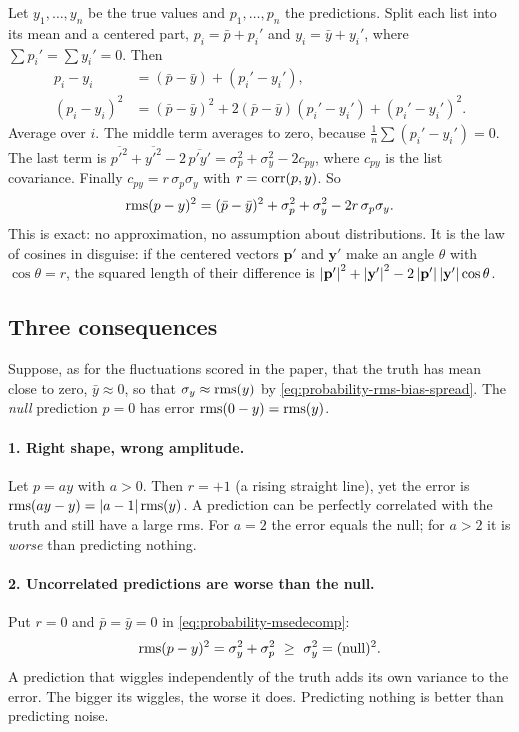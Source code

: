 Let $y_1,\dots,y_n$ be the true values and $p_1,\dots,p_n$ the predictions. Split each list into its mean and a centered part, $p_i=\bar p+p_i'$ and $y_i=\bar y+y_i'$, where $\sum p_i'=\sum y_i'=0$. Then
\begin{align*}
p_i-y_i &= (\bar p-\bar y) + (p_i'-y_i'),\\
(p_i-y_i)^2 &= (\bar p-\bar y)^2 + 2(\bar p-\bar y)(p_i'-y_i') + (p_i'-y_i')^2 .
\end{align*}
Average over $i$. The middle term averages to zero, because $\frac1n\sum(p_i'-y_i')=0$. The last term is $\overline{p'^2}+\overline{y'^2}-2\,\overline{p'y'}=\sigma_p^2+\sigma_y^2-2c_{py}$, where $c_{py}$ is the list covariance. Finally $c_{py}=r\,\sigma_p\sigma_y$ with $r=\mathrm{corr}(p,y)$. So
\begin{equation}
\mathrm{rms}(p-y)^2 = (\bar p-\bar y)^2 + \sigma_p^2 + \sigma_y^2 - 2r\,\sigma_p\sigma_y .
\label{eq:probability-msedecomp}
\end{equation}
This is exact: no approximation, no assumption about distributions. It is the law of cosines in disguise: if the centered vectors $\mathbf p'$ and $\mathbf y'$ make an angle $\theta$ with $\cos\theta=r$, the squared length of their difference is $\left\lvert \mathbf p'\right\rvert^2+\left\lvert \mathbf y'\right\rvert^2-2\left\lvert \mathbf p'\right\rvert\left\lvert \mathbf y'\right\rvert\cos\theta$.

\subsection{Three consequences}

Suppose, as for the fluctuations scored in the paper, that the truth has mean close to zero, $\bar y\approx0$, so that $\sigma_y\approx\mathrm{rms}(y)$ by \cref{eq:probability-rms-bias-spread}. The \emph{null} prediction $p=0$ has error $\mathrm{rms}(0-y)=\mathrm{rms}(y)$.

\paragraph{1. Right shape, wrong amplitude.} Let $p=a y$ with $a>0$. Then $r=+1$ (a rising straight line), yet the error is $\mathrm{rms}(ay-y)=\left\lvert a-1\right\rvert\mathrm{rms}(y)$. A prediction can be perfectly correlated with the truth and still have a large rms. For $a=2$ the error equals the null; for $a>2$ it is \emph{worse} than predicting nothing.

\paragraph{2. Uncorrelated predictions are worse than the null.} Put $r=0$ and $\bar p=\bar y=0$ in \cref{eq:probability-msedecomp}:
\begin{equation}
\rms(p-y)^2 = \sigma_y^2+\sigma_p^2 \ \ge\ \sigma_y^2 = (\text{null})^2 .
\label{eq:probability-uncorr}
\end{equation}
A prediction that wiggles independently of the truth adds its own variance to the error. The bigger its wiggles, the worse it does. Predicting nothing is better than predicting noise.

